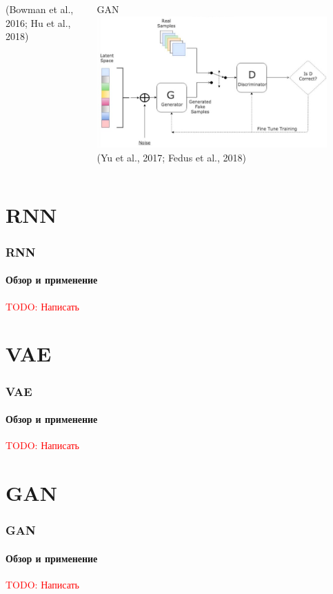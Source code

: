 \documentclass[10pt]{beamer}
\newcommand\TODO[1]{\textcolor{red}{{\Large TODO: #1}}}
\begin{document}
\begin{frame}
\begin{columns}[T]
\begin{column}[T]{0.33\textwidth}
\begin{center}
            (Bowman et al., 2016; Hu et al., 2018)
        \end{center}
    \end{column}
    \vline
    \begin{column}[T]{0.33\textwidth}
        \begin{center}
            GAN \\
            \includegraphics[width=0.9\textwidth]{images/gan.png} \\
            (Yu et al., 2017; Fedus et al., 2018)
        \end{center}
    \end{column}
\end{columns}

\end{frame}
\section{RNN}
\begin{frame}
\frametitle{RNN}
\framesubtitle{Обзор и применение}

\TODO{Написать}

\end{frame}
\section{VAE}
\begin{frame}
\frametitle{VAE}
\framesubtitle{Обзор и применение}

\TODO{Написать}

\end{frame}
\section{GAN}
\begin{frame}
\frametitle{GAN}
\framesubtitle{Обзор и применение}

\TODO{Написать}

\end{frame}
\end{document}
